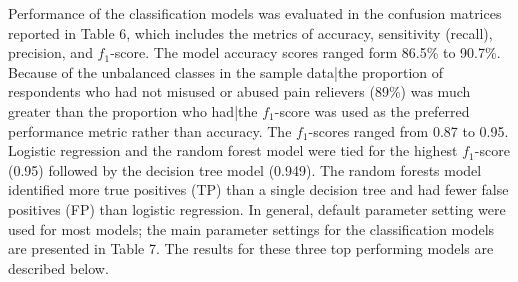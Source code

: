\documentclass[sigconf]{acmart}
\begin{document}
Performance of the classification models was evaluated in the confusion 
matrices reported in Table 6, which includes the metrics of accuracy, 
sensitivity (recall), precision, and $f_1$-score. The model accuracy 
scores ranged form 86.5\% to 90.7\%. Because of the unbalanced classes in 
the sample data|the proportion of respondents who had not misused or abused 
pain relievers (89\%) was much greater than the proportion who had|the 
$f_1$-score was used as the preferred performance metric rather than 
accuracy. The $f_1$-scores ranged from 0.87 to 0.95. Logistic regression 
and the random forest model were tied for the highest $f_1$-score (0.95) 
followed by the decision tree model (0.949). The random forests model 
identified more true positives (TP) than a single decision tree and had 
fewer false positives (FP) than logistic regression. In general, default 
parameter setting were used for most models; the main parameter settings 
for the classification models are presented in Table 7. The results for 
these three top performing models are described below.  
 
\end{document}
